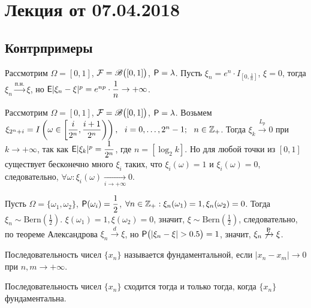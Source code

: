 \section{Лекция от 07.04.2018}
\subsection*{Контрпримеры}
\begin{example}
	Рассмотрим $\Omega = [0, 1]$, $\F = \B\big([0,1] \big)$, $\P = \lambda$. Пусть $\xi_n = e^n \cdot I_{\left[0, \frac{1}{n} \right]}$, $\xi = 0$, тогда $\xi_n \xrightarrow{\text{п.н.}} \xi$, но $\E | \xi_n - \xi |^p = e^{np} \cdot \dfrac{1}{n} \rightarrow + \infty$.
\end{example}
\begin{example}
	Рассмотрим $\Omega = [0, 1]$, $\F = \B\big([0,1] \big)$, $\P = \lambda$. Возьмем $\xi_{2^n + i} = I \left( \omega \in \left[ \dfrac{i}{2^n}, \dfrac{i + 1}{2^n} \right) \right), ~~i = 0,\ldots, 2^n - 1;~~n \in \Z_+$. Тогда $\xi_k \xrightarrow{L_p} 0$ при $k \rightarrow + \infty$, так как $\E | \xi_k |^p = \dfrac{1}{2^n}$, где $n = \left[ \log_2 k \right]$. Но для любой точки из $[0,1]$ существует бесконечно много $\xi_i$ таких, что $\xi_i(\omega) = 1$ и $\xi_i(\omega) = 0$, следовательно, $\forall \omega: \xi_i(\omega) \xrightarrow[i \rightarrow + \infty ]{} 0$.
\end{example}
\begin{example} 
	Пусть $\Omega = \{ \omega_1, \omega_2 \}$, $\P(\omega_i) = \dfrac{1}{2}$, $\forall n \in \Z_+: \xi_n(\omega_1) = 1, \xi_n(\omega_2) = 0$. Тогда $\xi_n \sim \text{Bern} \left( \frac{1}{2} \right)$. $\xi(\omega_1) = 1, \xi(\omega_2) = 0$, значит, $\xi \sim \text{Bern} \left( \frac{1}{2} \right)$, следовательно, по теореме Александрова $\xi_n \xrightarrow{d} \xi$, но $\P \big( | \xi_n - \xi| > 0.5 \big) = 1$, значит, $\xi_n \not\xrightarrow{\P} \xi$. 
\end{example}
\begin{definition}
	Последовательность чисел $\{ x_n \}$ называется фундаментальной, если $|x_n - x_m| \rightarrow 0$ при $n, m \rightarrow +\infty$.
\end{definition}
\begin{theorem}
	Последовательность чисел $\{ x_n \}$ сходится тогда и только тогда, когда $\{ x_n \}$ фундаментальна.
\end{theorem}
